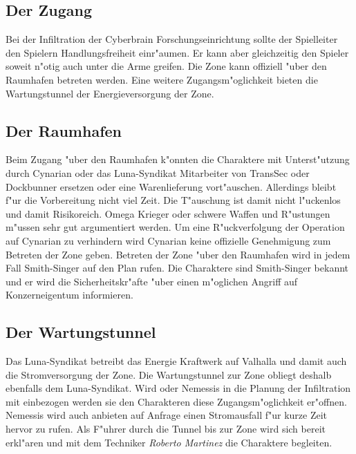 \subsection{Der Zugang} 
Bei der Infiltration der Cyberbrain Forschungseinrichtung sollte der Spielleiter den Spielern Handlungsfreiheit einr"aumen. Er kann aber gleichzeitig den Spieler soweit n"otig auch unter die Arme greifen. Die Zone kann offiziell "uber den Raumhafen betreten werden. Eine weitere Zugangsm"oglichkeit bieten die Wartungstunnel der Energieversorgung der Zone.

\subsection{Der Raumhafen} 
Beim Zugang "uber den Raumhafen k"onnten die Charaktere mit Unterst"utzung durch Cynarian oder das Luna-Syndikat Mitarbeiter von TransSec oder Dockbunner ersetzen oder eine Warenlieferung vort"auschen. Allerdings bleibt f"ur die Vorbereitung nicht viel Zeit. Die T"auschung ist damit nicht l"uckenlos und damit Risikoreich. Omega Krieger oder schwere Waffen und R"ustungen m"ussen sehr gut argumentiert werden. Um eine R"uckverfolgung der Operation auf Cynarian zu verhindern wird Cynarian keine offizielle Genehmigung zum Betreten der Zone geben. Betreten der Zone "uber den Raumhafen wird in jedem Fall Smith-Singer auf den Plan rufen. Die Charaktere sind Smith-Singer bekannt und er wird die Sicherheitskr"afte "uber einen m"oglichen Angriff auf Konzerneigentum informieren. 

\subsection{Der Wartungstunnel} 
Das Luna-Syndikat betreibt das Energie Kraftwerk auf Valhalla und damit auch die Stromversorgung der Zone. Die Wartungstunnel zur Zone obliegt deshalb ebenfalls dem Luna-Syndikat. Wird \xl{} oder Nemessis in die Planung der Infiltration mit einbezogen werden sie den Charakteren diese Zugangsm"oglichkeit er"offnen. Nemessis wird auch anbieten auf Anfrage einen Stromausfall f"ur kurze Zeit hervor zu rufen. Als F"uhrer durch die Tunnel bis zur Zone wird sich \xl{} bereit erkl"aren und mit dem Techniker \emph{Roberto Martinez} die Charaktere begleiten.


